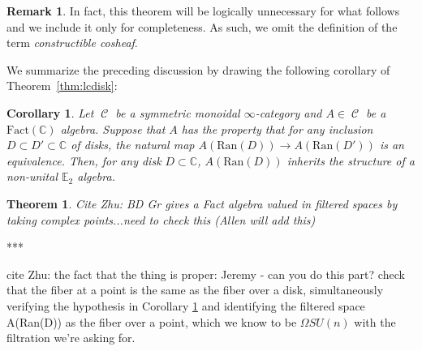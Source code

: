 \documentclass[reqno, oneside]{amsart}
\theoremstyle{definition}
\newtheorem{rmk}[nul]{Remark}
\theoremstyle{plain}
\newtheorem{thm}[nul]{Theorem}
\newtheorem{cor}{Corollary}[nul]
\DeclareMathOperator{\C}{\mathcal{C}}
\begin{document}
\begin{rmk}
In fact, this theorem will be logically unnecessary for what follows and we include it only for completeness.  As such, we omit the definition of the term \emph{constructible cosheaf}.  
\end{rmk}

We summarize the preceding discussion by drawing the following corollary of Theorem~\ref{thm:lcdisk}:
\begin{cor} \label{cor:E2crit}
Let $\C$ be a symmetric monoidal $\infty$-category and $A \in \C$ be a $\mathrm{Fact}(\mathbb{C})$ algebra.  Suppose that $A$ has the property that for any inclusion $D\subset D' \subset \mathbb{C}$ of disks, the natural map $A(\mathrm{Ran}(D))\to A(\mathrm{Ran}(D'))$ is an equivalence.  Then, for any disk $D\subset \mathbb{C}$, $A(\mathrm{Ran}(D))$ inherits the structure of a non-unital $\mathbb{E}_2$ algebra.  
\end{cor}


\begin{thm}
Cite Zhu: BD Gr gives a Fact algebra valued in filtered spaces by taking complex points...need to check this (Allen will add this)
\end{thm}

***


cite Zhu: the fact that the thing is proper: Jeremy - can you do this part?
check that the fiber at a point is the same as the fiber over a disk, simultaneously verifying the hypothesis in Corollary \ref{cor:E2crit} and identifying the filtered space A(Ran(D)) as the fiber over a point, which we know to be $\Omega SU(n)$ with the filtration we're asking for.  
\end{document}
